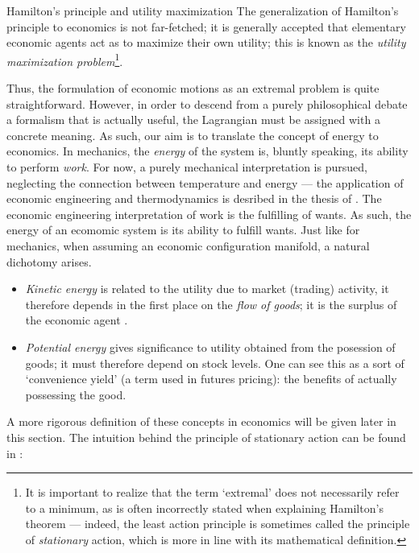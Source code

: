 \begin{econ}{Hamilton's principle and utility maximization}
    The generalization of Hamilton's principle to economics is not far-fetched; it is generally accepted that elementary economic agents act as to maximize their own utility; this is known as the \emph{utility maximization problem}\footnote{It is important to realize that the term `extremal' does not necessarily refer to a minimum, as is often incorrectly stated when explaining Hamilton's theorem --- indeed, the least action principle is sometimes called the principle of \emph{stationary} action, which is more in line with its mathematical definition.}. \\

    Thus, the formulation of economic motions as an extremal problem is quite straightforward. However, in order to descend from a purely philosophical debate a formalism that is actually useful, the Lagrangian must be assigned with a concrete meaning. As such, our aim is to translate the concept of energy to economics. In mechanics, the \emph{energy} of the system is, bluntly speaking, its ability to perform \emph{work}. For now, a purely mechanical interpretation is pursued, neglecting the connection between temperature and energy --- the application of economic engineering and thermodynamics is desribed in the thesis of \citet{Manders2019}. The economic engineering interpretation of work is the fulfilling of wants. As such, the energy of an ecomomic system is its ability to fulfill wants. Just like for mechanics, when assuming an economic configuration manifold, a natural dichotomy arises.
    \begin{itemize}
        \item \emph{Kinetic energy} is related to the utility due to market (trading) activity, it therefore depends in the first place on the \emph{flow of goods}; it is the surplus of the economic agent \cite{Mankiw2017}.
        \item \emph{Potential energy} gives significance to utility obtained from the posession of goods; it must therefore depend on stock levels. One can see this as a sort of `convenience yield' (a term used in futures pricing): the benefits of actually possessing the good.
    \end{itemize}
    A more rigorous definition of these concepts in economics will be given later in this section. The intuition behind the principle of stationary action can be found in \citet{Feynman2010}:
    \begin{quote}

\end{quote}
\end{econ}
